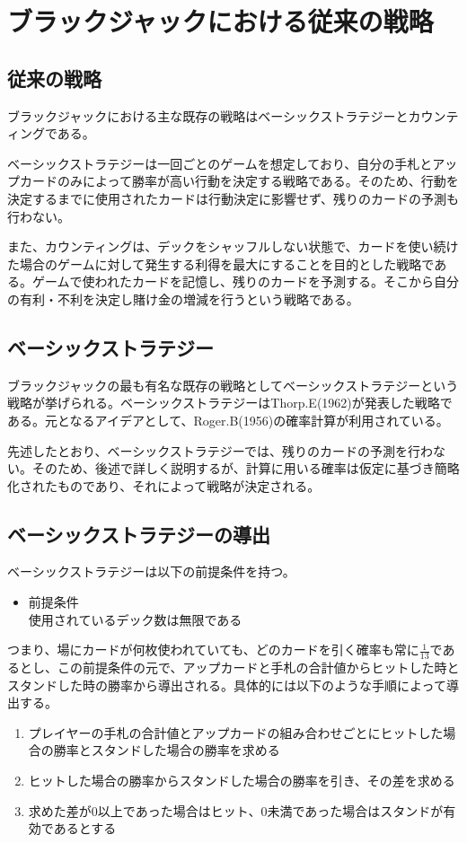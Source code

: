     \section{ブラックジャックにおける従来の戦略}
    \subsection{従来の戦略}

        ブラックジャックにおける主な既存の戦略はベーシックストラテジーとカウンティングである。

        ベーシックストラテジーは一回ごとのゲームを想定しており、自分の手札とアップカードのみによって勝率が高い行動を決定する戦略である。そのため、行動を決定するまでに使用されたカードは行動決定に影響せず、残りのカードの予測も行わない。

        また、カウンティングは、デックをシャッフルしない状態で、カードを使い続けた場合のゲームに対して発生する利得を最大にすることを目的とした戦略である。ゲームで使われたカードを記憶し、残りのカードを予測する。そこから自分の有利・不利を決定し賭け金の増減を行うという戦略である。
    \subsection{ベーシックストラテジー}
        ブラックジャックの最も有名な既存の戦略としてベーシックストラテジーという戦略が挙げられる。ベーシックストラテジーはThorp.E(1962)が発表した戦略である。元となるアイデアとして、Roger.B(1956)の確率計算が利用されている。

        先述したとおり、ベーシックストラテジーでは、残りのカードの予測を行わない。そのため、後述で詳しく説明するが、計算に用いる確率は仮定に基づき簡略化されたものであり、それによって戦略が決定される。
    \subsection{ベーシックストラテジーの導出}
        ベーシックストラテジーは以下の前提条件を持つ。
        \begin{itemize}
            \item 前提条件\\
                使用されているデック数は無限である
        \end{itemize}

        つまり、場にカードが何枚使われていても、どのカードを引く確率も常に$\frac{1}{13}$であるとし、この前提条件の元で、アップカードと手札の合計値からヒットした時とスタンドした時の勝率から導出される。具体的には以下のような手順によって導出する。
        \begin{enumerate}
            \item プレイヤーの手札の合計値とアップカードの組み合わせごとにヒットした場合の勝率とスタンドした場合の勝率を求める
            \item ヒットした場合の勝率からスタンドした場合の勝率を引き、その差を求める
            \item 求めた差が0以上であった場合はヒット、0未満であった場合はスタンドが有効であるとする
        \end{enumerate}

